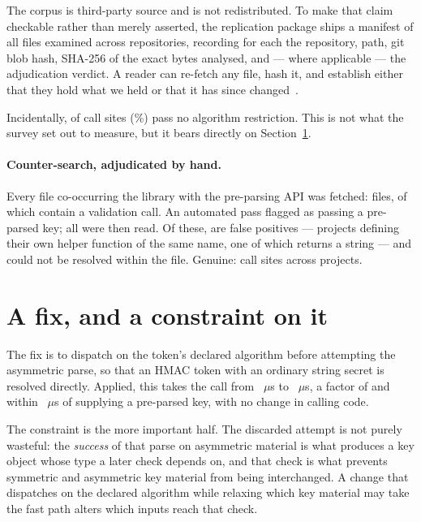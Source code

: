 \documentclass[pdflatex,sn-basic,twocolumn]{sn-jnl}
\begin{document}
The corpus is third-party source and is not redistributed. To make that claim
checkable rather than merely asserted, the replication package ships a manifest
of all \ManifestFiles{} files examined across \ManifestRepos{} repositories,
recording for each the repository, path, git blob hash, SHA-256 of the exact
bytes analysed, and --- where applicable --- the adjudication verdict. A reader
can re-fetch any file, hash it, and establish either that they hold what we held
or that it has since changed~\cite{artifact2026}.

Incidentally, \SampleNoAlgorithms{} of \SampleCallSites{} call sites
(\SampleNoAlgorithmsPct\%) pass no algorithm restriction. This is not what the
survey set out to measure, but it bears directly on Section~\ref{sec:fix}.

\paragraph{Counter-search, adjudicated by hand.} Every file co-occurring the
library with the pre-parsing API was fetched: \CounterFilesFetched{} files, of
which \CounterWithVerify{} contain a validation call. An automated pass flagged
\AdjudicatedTotal{} as passing a pre-parsed key; all were then read. Of these,
\AdjudicatedFalsePositive{} are false positives --- projects defining their own
helper function of the same name, one of which returns a string --- and
\AdjudicatedUnresolved{} could not be resolved within the file. Genuine:
\AdjudicatedGenuine{} call sites across \AdjudicatedGenuineProjects{} projects.

\section{A fix, and a constraint on it}\label{sec:fix}

The fix is to dispatch on the token's declared algorithm before attempting the
asymmetric parse, so that an HMAC token with an ordinary string secret is
resolved directly. Applied, this takes the call from \HostJwtString~$\mu$s to
\HostJwtStringSafe~$\mu$s, a factor of \HostSafePatchRatio{} and within
\HostSafePatchResidual~$\mu$s of supplying a pre-parsed key, with no change in
calling code.

The constraint is the more important half. The discarded attempt is not purely
wasteful: the \emph{success} of that parse on asymmetric material is what
produces a key object whose type a later check depends on, and that check is what
prevents symmetric and asymmetric key material from being interchanged. A change
that dispatches on the declared algorithm while relaxing which key material may
take the fast path alters which inputs reach that check.
\end{document}
